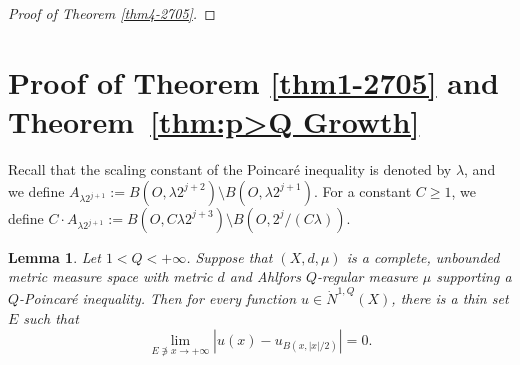 \documentclass[10pt]{amsart}
\newtheorem{lemma}[theorem]{Lemma}
\numberwithin{equation}{section}
\begin{document}
\begin{proof}[Proof of Theorem \ref{thm4-2705}]



 \end{proof}















\section{Proof of Theorem \ref{thm1-2705} and Theorem~\ref{thm:p>Q Growth}}
Recall that the scaling constant of the Poincar\'e inequality is denoted by $\lambda$, and we define $A_{\lambda 2^{j+1}}:=B(O,\lambda 2^{j+2})\setminus B(O,\lambda 2^{j+1})$.  For a constant $C\ge 1$, we define $C\cdot A_{\lambda 2^{j+1}}:=B(O,C\lambda 2^{j+3})\setminus B(O,2^{j}/(C\lambda))$.


\begin{lemma}\label{thm1-0705}
Let  $1<Q<+\infty$. 
Suppose that $(X,d,\mu)$ is a complete, unbounded metric measure space with metric $d$ and Ahlfors $Q$-regular measure $\mu$ supporting a $Q$-Poincar\'e inequality. 
 Then for every function $u\in \dot N^{1,Q}(X)$, there is a thin set $E$ such that
 	\[
		\lim_{E\not\ni x\to{+\infty}}\left |u(x) -u_{B(x, |x|/2)}\right |=0.
	\]
 \end{lemma}
 
\end{document}
